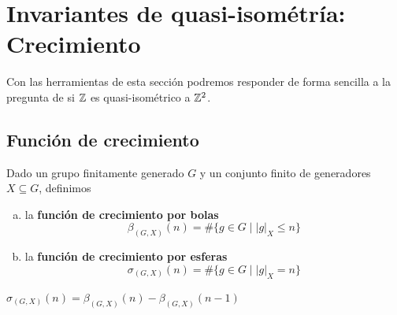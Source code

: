 \documentclass[twoside, 11pt]{article}
\begin{document}
\section{Invariantes de quasi-isométría: Crecimiento}
Con las herramientas de esta sección podremos responder de forma sencilla a la pregunta de si $\mathbb{Z}$ es quasi-isométrico a $\mathbb{Z}^2$.
\subsection{Función de crecimiento}
\begin{defi}
Dado un grupo finitamente generado $G$ y un conjunto finito de generadores $X\subseteq G$, definimos
\begin{enumerate}[a)]
\item la \textbf{función de crecimiento por bolas} 
\[
\beta_{(G,X)}(n)=\#\{g\in G\mid |g|_X\leq n\}
\]
\item la \textbf{función de crecimiento por esferas}
\[
\sigma_{(G,X)}(n)=\#\{g\in G\mid |g|_X=n\}
\]
\end{enumerate}
\end{defi}

\begin{observacion}
$\sigma_{(G,X)}(n)=\beta_{(G,X)}(n)-\beta_{(G,X)}(n-1)$
\end{observacion}
\end{document}
